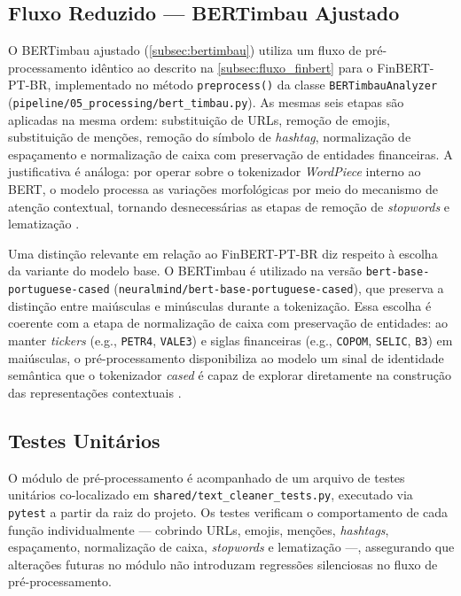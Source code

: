 	
\subsection{Fluxo Reduzido --- BERTimbau Ajustado}
\label{subsec:fluxo_bertimbau}
	
O BERTimbau ajustado (\autoref{subsec:bertimbau}) utiliza um fluxo de pré-processamento idêntico ao descrito na \autoref{subsec:fluxo_finbert} para o FinBERT-PT-BR, implementado no método \texttt{preprocess()} da classe \texttt{BERTimbauAnalyzer} (\texttt{pipeline/05\_processing/bert\_timbau.py}). As mesmas seis etapas são aplicadas na mesma ordem: substituição de URLs, remoção de emojis, substituição de menções, remoção do símbolo de \textit{hashtag}, normalização de espaçamento e normalização de caixa com preservação de entidades financeiras. A justificativa é análoga: por operar sobre o tokenizador \textit{WordPiece} interno ao BERT, o modelo processa as variações morfológicas por meio do mecanismo de atenção contextual, tornando desnecessárias as etapas de remoção de \textit{stopwords} e lematização \cite{devlin2019}.
	
Uma distinção relevante em relação ao FinBERT-PT-BR diz respeito à escolha da variante do modelo base. O BERTimbau é utilizado na versão \texttt{bert-base-portuguese-cased} (\texttt{neuralmind/bert-base-portuguese-cased}), que preserva a distinção entre maiúsculas e minúsculas durante a tokenização. Essa escolha é coerente com a etapa de normalização de caixa com preservação de entidades: ao manter \textit{tickers} (e.g., \texttt{PETR4}, \texttt{VALE3}) e siglas financeiras (e.g., \texttt{COPOM}, \texttt{SELIC}, \texttt{B3}) em maiúsculas, o pré-processamento disponibiliza ao modelo um sinal de identidade semântica que o tokenizador \textit{cased} é capaz de explorar diretamente na construção das representações contextuais \cite{souza2020}.
	
	
\subsection{Testes Unitários}
\label{subsec:testes_preprocessamento}

O módulo de pré-processamento é acompanhado de um arquivo de testes unitários co-localizado em \texttt{shared/text\_cleaner\_tests.py}, executado via \texttt{pytest} a partir da raiz do projeto. Os testes verificam o comportamento de cada função individualmente — cobrindo URLs, emojis, menções, \textit{hashtags}, espaçamento, normalização de caixa, \textit{stopwords} e lematização —, assegurando que alterações futuras no módulo não introduzam regressões silenciosas no fluxo de
pré-processamento.